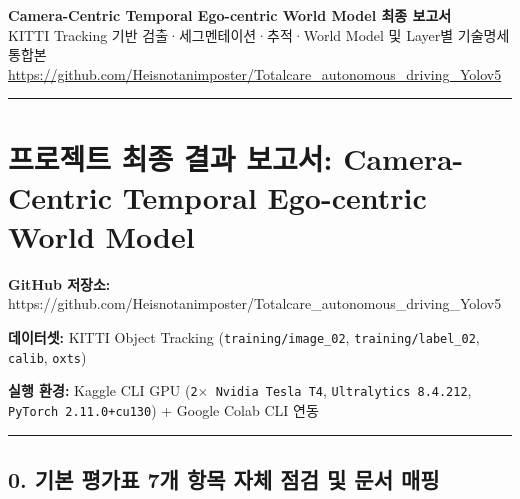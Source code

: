 \documentclass[10.5pt,a4paper]{article}
\begin{document}
\begin{center}
{\LARGE\bfseries Camera-Centric Temporal Ego-centric World Model 최종 보고서}\\[6pt]
{\normalsize\color{gray} KITTI Tracking 기반 검출·세그멘테이션·추적·World Model 및 Layer별 기술명세 통합본}\\[4pt]
{\small\href{https://github.com/Heisnotanimposter/Totalcare_autonomous_driving_Yolov5}{https://github.com/Heisnotanimposter/Totalcare\_autonomous\_driving\_Yolov5}}
\end{center}
\vspace{4pt}
\hrule
\vspace{8pt}

\tableofcontents
\newpage
\section{프로젝트 최종 결과 보고서: Camera-Centric Temporal Ego-centric World Model}

\textbf{GitHub 저장소:} https:\allowbreak{}/\allowbreak{}/\allowbreak{}github.\allowbreak{}com/\allowbreak{}Heisnotanimposter/\allowbreak{}Totalcare\_\allowbreak{}autonomous\_\allowbreak{}driving\_\allowbreak{}Yolov5

\textbf{데이터셋:} KITTI Object Tracking (\texttt{training/\allowbreak{}image\_\allowbreak{}02}, \texttt{training/\allowbreak{}label\_\allowbreak{}02}, \texttt{calib}, \texttt{oxts})

\textbf{실행 환경:} Kaggle CLI GPU (\texttt{2$\times$ Nvidia Tesla T4}, \texttt{Ultralytics 8.\allowbreak{}4.\allowbreak{}212}, \texttt{PyTorch 2.\allowbreak{}11.\allowbreak{}0+cu130}) + Google Colab CLI 연동


\par\noindent\rule{\textwidth}{0.4pt}\par\medskip

\subsection{0. 기본 평가표 7개 항목 자체 점검 및 문서 매핑}
\end{document}
